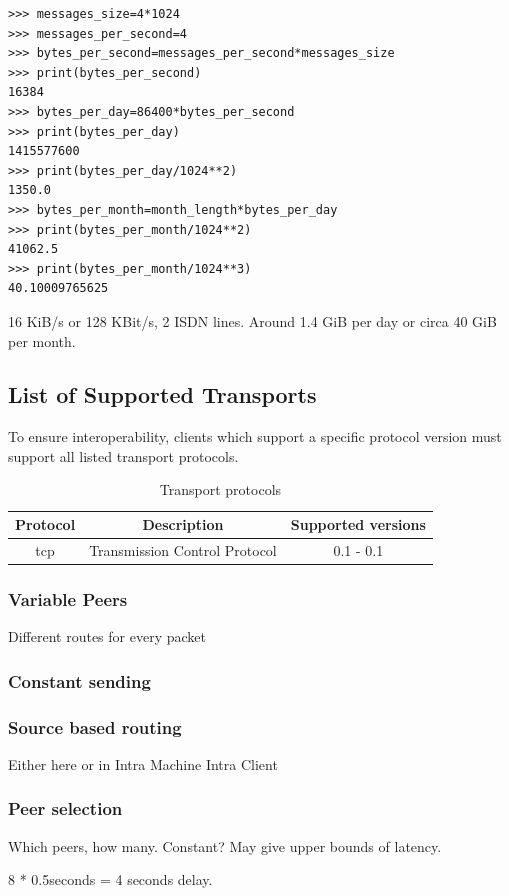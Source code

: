 \begin{verbatim}
>>> messages_size=4*1024
>>> messages_per_second=4
>>> bytes_per_second=messages_per_second*messages_size
>>> print(bytes_per_second)
16384
>>> bytes_per_day=86400*bytes_per_second
>>> print(bytes_per_day)
1415577600
>>> print(bytes_per_day/1024**2)
1350.0
>>> bytes_per_month=month_length*bytes_per_day
>>> print(bytes_per_month/1024**2)
41062.5
>>> print(bytes_per_month/1024**3)
40.10009765625
\end{verbatim}
16 KiB/s or 128 KBit/s, 2 ISDN lines. Around 1.4 GiB per day or
circa 40 GiB per month.

\subsection{List of Supported Transports}
To ensure interoperability, clients which support a specific
protocol version must support all listed transport protocols.
\begin{longtable}{|c|c|c|}
\caption{Transport protocols}\\
\hline
\textbf{Protocol} & \textbf{Description} & \textbf{Supported versions}\\
\hline
tcp & Transmission Control Protocol & 0.1 - 0.1\\
\hline
\end{longtable}

\subsubsection{Variable Peers}
Different routes for every packet
\subsubsection{Constant sending}

\subsubsection{Source based routing}
Either here or in Intra Machine Intra Client
\subsubsection{Peer selection}
Which peers, how many. Constant? May give upper bounds of latency.

8 * 0.5seconds = 4 seconds delay.

